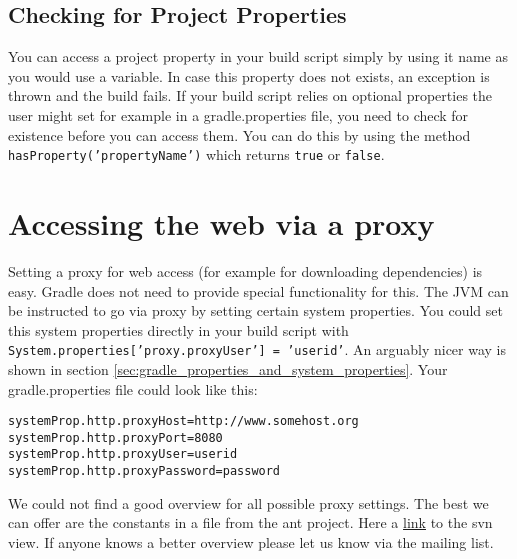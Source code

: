 \subsection{Checking for Project Properties} %
\label{sub:checking_for_project_properties}
You can access a project property in your build script simply by using it name as you would use a variable. In case this property does not exists, an exception is thrown and the build fails. If your build script relies on optional properties the user might set for example in a gradle.properties file, you need to check for existence before you can access them. You can do this by using the method \texttt{hasProperty('propertyName')} which returns \texttt{true} or \texttt{false}.

\section{Accessing the web via a proxy} %
\label{sec:accessing_the_web_via_a_proxy}
Setting a proxy for web access (for example for downloading dependencies) is easy. Gradle does not need to provide special functionality for this. The JVM can be instructed to go via proxy by setting certain system properties. You could set this system properties directly in your build script with \texttt{System.properties['proxy.proxyUser'] = 'userid'}. An arguably nicer way is shown in section \ref{sec:gradle_properties_and_system_properties}. Your gradle.properties file could look like this:
\begin{Verbatim}
systemProp.http.proxyHost=http://www.somehost.org
systemProp.http.proxyPort=8080
systemProp.http.proxyUser=userid
systemProp.http.proxyPassword=password	
\end{Verbatim}
We could not find a good overview for all possible proxy settings. The best we can offer are the constants in a file from the ant project. Here a \href{http://svn.apache.org/viewvc/ant/core/trunk/src/main/org/apache/tools/ant/util/ProxySetup.java?view=markup&pathrev=556977}{link} to the svn view. If anyone knows a better overview please let us know via the mailing list.  

